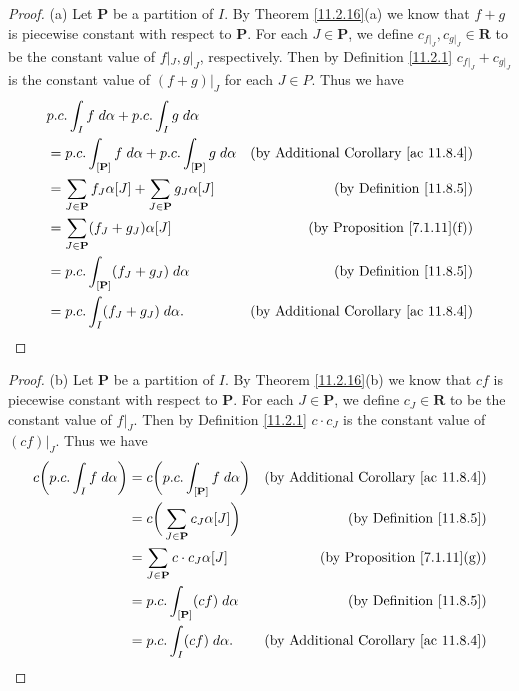 \begin{proof}{(a)}
    Let \(\mathbf{P}\) be a partition of \(I\).
    By Theorem \ref{11.2.16}(a) we know that \(f + g\) is piecewise constant with respect to \(\mathbf{P}\).
    For each \(J \in \mathbf{P}\), we define \(c_{f|_J}, c_{g|_J} \in \mathbf{R}\) to be the constant value of \(f|_J, g|_J\), respectively.
    Then by Definition \ref{11.2.1} \(c_{f|_J} + c_{g|_J}\) is the constant value of \((f + g)|_J\) for each \(J \in P\).
    Thus we have
    \begin{align*}
         & p.c. \int_I f \; d \alpha + p.c. \int_I g \; d \alpha                                                                                \\
         & = p.c. \int_{[\mathbf{P}]} f \; d \alpha + p.c. \int_{[\mathbf{P}]} g \; d \alpha & \text{(by Additional Corollary \ref{ac 11.8.4})} \\
         & = \sum_{J \in \mathbf{P}} f_J \alpha[J] + \sum_{J \in \mathbf{P}} g_J \alpha[J]   & \text{(by Definition \ref{11.8.5})}              \\
         & = \sum_{J \in \mathbf{P}} (f_J + g_J) \alpha[J]                                   & \text{(by Proposition \ref{7.1.11}(f))}          \\
         & = p.c. \int_{[\mathbf{P}]} (f_J + g_J) \; d \alpha                                & \text{(by Definition \ref{11.8.5})}              \\
         & = p.c. \int_I (f_J + g_J) \; d \alpha.                                            & \text{(by Additional Corollary \ref{ac 11.8.4})}
    \end{align*}
\end{proof}

\begin{proof}{(b)}
    Let \(\mathbf{P}\) be a partition of \(I\).
    By Theorem \ref{11.2.16}(b) we know that \(cf\) is piecewise constant with respect to \(\mathbf{P}\).
    For each \(J \in \mathbf{P}\), we define \(c_J \in \mathbf{R}\) to be the constant value of \(f|_J\).
    Then by Definition \ref{11.2.1} \(c \cdot c_J\) is the constant value of \((cf)|_J\).
    Thus we have
    \begin{align*}
        c \bigg(p.c. \int_I f \; d \alpha\bigg) & = c \bigg(p.c. \int_{[\mathbf{P}]} f \; d \alpha\bigg) & \text{(by Additional Corollary \ref{ac 11.8.4})} \\
                                                & = c \bigg(\sum_{J \in \mathbf{P}} c_J \alpha[J]\bigg)  & \text{(by Definition \ref{11.8.5})}              \\
                                                & = \sum_{J \in \mathbf{P}} c \cdot c_J \alpha[J]        & \text{(by Proposition \ref{7.1.11}(g))}          \\
                                                & = p.c. \int_{[\mathbf{P}]} (c f) \; d \alpha           & \text{(by Definition \ref{11.8.5})}              \\
                                                & = p.c. \int_I (c f) \; d \alpha.                       & \text{(by Additional Corollary \ref{ac 11.8.4})}
    \end{align*}
\end{proof}

